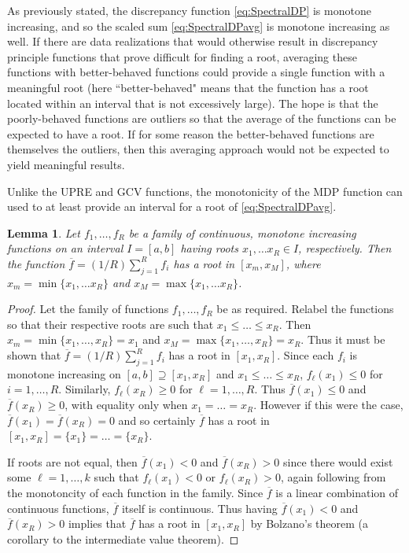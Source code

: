 \documentclass[12pt]{article}
\newtheorem{lemma}{Lemma}[section]
\begin{document}
As previously stated, the discrepancy function \eqref{eq:SpectralDP} is monotone increasing, and so the scaled sum \eqref{eq:SpectralDPavg} is monotone increasing as well. If there are data realizations that would otherwise result in discrepancy principle functions that prove difficult for finding a root, averaging these functions with better-behaved functions could provide a single function with a meaningful root (here ``better-behaved" means that the function has a root located within an interval that is not excessively large). The hope is that the poorly-behaved functions are outliers so that the average of the functions can be expected to have a root. If for some reason the better-behaved functions are themselves the outliers, then this averaging approach would not be expected to yield meaningful results. \par 
Unlike the UPRE and GCV functions, the monotonicity of the MDP function can used to at least provide an interval for a root of \eqref{eq:SpectralDPavg}. 
\begin{lemma}
Let $f_1,\ldots,f_R$ be a family of continuous, monotone increasing functions on an interval $I = [a,b]$ having roots $x_1,\ldots x_R \in I$, respectively. Then the function $\overline{f} = (1/R)\sum_{j=1}^R f_i$ has a root in $[x_m,x_M]$, where $x_m = \min\{x_1,\ldots x_R\}$ and $x_M = \max\{x_1,\ldots x_R\}$.
\end{lemma}
\begin{proof}
Let the family of functions $f_1,\ldots,f_R$ be as required. Relabel the functions so that their respective roots are such that $x_1 \leq \ldots \leq x_R$. Then $x_m = \min\{x_1,\ldots,x_R\} = x_1$ and $x_M = \max\{x_1,\ldots,x_R\} = x_R$. Thus it must be shown that $\overline{f} = (1/R)\sum_{j=1}^R f_i$ has a root in $[x_1,x_R]$. Since each $f_i$ is monotone increasing on $[a,b] \supseteq [x_1,x_R]$ and $x_1 \leq \ldots \leq x_R$, $f_\ell(x_1) \leq 0$ for $i = 1,\ldots,R$. Similarly, $f_\ell(x_R) \geq 0$ for $\ell = 1,\ldots,R$. Thus $\overline{f}(x_1) \leq 0$ and $\overline{f}(x_R) \geq 0$, with equality only when $x_1 = \ldots = x_R$. However if this were the case, $\overline{f}(x_1) = \overline{f}(x_R) = 0$ and so certainly $\overline{f}$ has a root in $[x_1,x_R] = \{x_1\} = \ldots = \{x_R\}$. \par 
If roots are not equal, then $\overline{f}(x_1) < 0$ and $\overline{f}(x_R) > 0$ since there would exist some $\ell = 1,\ldots,k$ such that $f_\ell(x_1) < 0$ or $f_\ell(x_R) > 0$, again following from the monotoncity of each function in the family. Since $\overline{f}$ is a linear combination of continuous functions, $\overline{f}$ itself is continuous. Thus having $\overline{f}(x_1) < 0$ and $\overline{f}(x_R) > 0$ implies that $\overline{f}$ has a root in $[x_1,x_R]$ by Bolzano's theorem (a corollary to the intermediate value theorem).
\end{proof}
\end{document}
